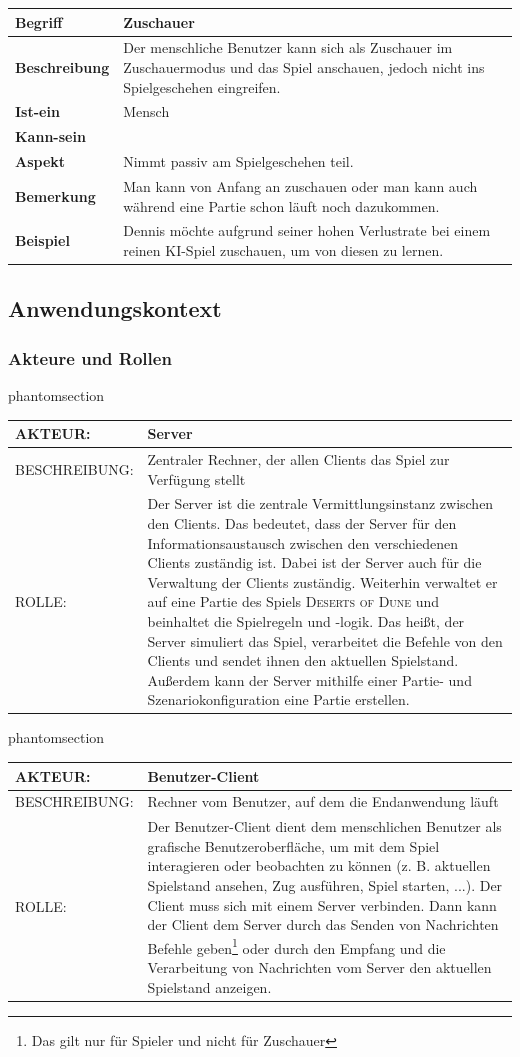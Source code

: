 \documentclass[12pt]{article}
\makeatletter
\newcommand{\labeltext}[2]{%
  \@bsphack
  \csname phantomsection\endcsname %
  \def\@currentlabel{#1}{\label{#2}}%
  \@esphack
}
\newcounter{fa}
\newcounter{nfa}
\newcommand{\akteur}[4]{
\labeltext{#2}{#1}
\begin{tabularx}{16cm}{|l|X|}
\hline 
AKTEUR: & #2 \\
\hline
BESCHREIBUNG: & #3 \\
\hline
ROLLE: & #4 \\ 
\hline
\end{tabularx}
}
\makeatother
\begin{document}
\begin{tabularx}{\linewidth}{|l|X|}
\hline
\textbf{Begriff} & \textbf{Zuschauer} \\
\hline
\textbf{Beschreibung} & Der menschliche Benutzer kann sich als Zuschauer im Zuschauermodus und das Spiel anschauen, jedoch nicht ins Spielgeschehen eingreifen. \\
\hline
\textbf{Ist-ein} & Mensch\\
\hline
\textbf{Kann-sein} & \\
\hline
\textbf{Aspekt} & Nimmt passiv am Spielgeschehen teil.\\
\hline
\textbf{Bemerkung} & Man kann von Anfang an zuschauen oder man kann auch während eine Partie schon läuft noch dazukommen.\\
\hline
\textbf{Beispiel} &  Dennis möchte aufgrund seiner hohen Verlustrate bei einem reinen KI-Spiel zuschauen, um von diesen zu lernen. \\
\hline
\end{tabularx}

\subsection{Anwendungskontext}
\subsubsection{Akteure und Rollen}

\akteur{A-Server}{Server}{Zentraler Rechner, der allen Clients das Spiel zur Verfügung stellt}{Der Server ist die zentrale Vermittlungsinstanz zwischen den Clients. Das bedeutet, dass der Server für den Informationsaustausch zwischen den verschiedenen Clients zuständig ist. Dabei ist der Server auch für die Verwaltung der Clients zuständig. Weiterhin verwaltet er auf eine Partie des Spiels \textsc{Deserts of Dune} und beinhaltet die Spielregeln und -logik. Das heißt, der Server simuliert das Spiel, verarbeitet die Befehle von den Clients und sendet ihnen den aktuellen Spielstand. Außerdem kann der Server mithilfe einer Partie- und Szenariokonfiguration eine Partie erstellen.}

\akteur{A-Benutzer-Client}{Benutzer-Client}{Rechner vom Benutzer, auf dem die Endanwendung läuft}{Der Benutzer-Client dient dem menschlichen Benutzer als grafische Benutzeroberfläche, um mit dem Spiel interagieren oder beobachten zu können (z. B. aktuellen Spielstand ansehen, Zug ausführen, Spiel starten, ...). Der Client muss sich mit einem Server verbinden. Dann kann der Client dem Server durch das Senden von Nachrichten Befehle geben\footnote{Das gilt nur für Spieler und nicht für Zuschauer} oder durch den Empfang und die Verarbeitung von Nachrichten vom Server den aktuellen Spielstand anzeigen.}
\end{document}
